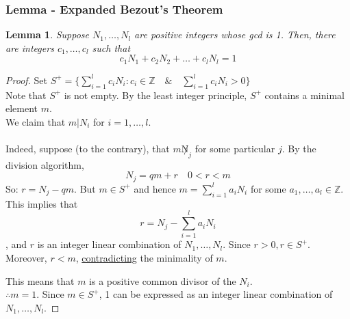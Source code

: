 \documentclass[10pt]{article}
\newcommand{\Z}{\mathbb{Z}}
\newtheorem{lemma}[theorem]{Lemma}
\theoremstyle{definition}
\theoremstyle{remark}
\def\Z{\mathbb{ Z}}
\def\ul{\underline}
\newcommand{\mi}[1]{\mathit{#1}}
\begin{document}
\subsubsection{Lemma - Expanded Bezout's Theorem}
\begin{lemma}
Suppose $N_1,\ldots,N_l$ are positive integers whose gcd is 1.  Then, there are integers $c_1,\ldots,c_l$ such that $$c_1N_1 + c_2N_2 + \ldots + c_lN_l = 1$$
\end{lemma}
\begin{proof}
Set $\mi{S}^+ = \{\sum_{i=1}^{l}c_iN_i:c_i\in\Z \quad \& \quad \sum_{i=1}^{l}c_iN_i > 0\}$\\
Note that $\mi{S}^+$ is not empty.  By the least integer principle, $\mi{S}^+$ contains a minimal element $m$.
\\
We claim that $m|N_i$ for $i = 1,\ldots,l$.\\
\\
Indeed, suppose (to the contrary), that $m \not N_j$ for some particular $j$.  By the division algorithm, $$N_j = qm + r \quad 0 < r < m$$
So: $r = N_j - qm$.  But $m \in \mi{S}^+$ and hence $m = \sum_{i=1}^{l}a_iN_i$ for some $a_1,\ldots,a_l \in \Z$.  This implies that $$r = N_j - \sum_{i=1}^{l}a_iN_i$$, and $r$ is an integer linear combination of $N_1,\ldots,N_l$.  Since $r>0, r \in \mi{S}^+$.  Moreover, $r < m$, \ul{contradicting} the minimality of $m$.

This means that $m$ is a positive common divisor of the $N_i$.\\

$\therefore m = 1$.  Since $ m \in \mi{S}^+$, 1 can be expressed as an integer linear combination of $N_1,\ldots,N_l$.
\end{proof}
\pagebreak
\end{document}
